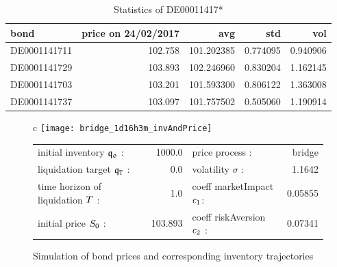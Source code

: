 \documentclass[10pt,a4paper]{article}
\begin{document}
	
	\begin{table}
		\centering
	\begin{scriptsize}
			{
	\begin{tabular}{lrrrr} 
	 \textbf{bond}  &  \textbf{price  on  24/02/2017} &         \textbf{avg} &       \textbf{std} &        \textbf{vol} \\
	 \hline
	  DE0001141711 &              102.758 &  101.202385 &  0.774095 &         0.940906 \\
	  DE0001141729 &              103.893 &  102.246960 &  0.830204 &         1.162145  \\
	  DE0001141703 &              103.201 &  101.593300 &  0.806122 &          1.363008  \\
	  DE0001141737 &              103.097 &  101.757502 &  0.505060 &         1.190914  
  	\end{tabular}} 
  \end{scriptsize}
\caption{{Statistics of DE00011417* }}
\label{tab.DE000stat}
\end{table}


	\begin{center}
		\begin{figure}
			\centering
			\begin{tabular}{c}
			\texttt{[image: bridge\_1d16h3m\_invAndPrice]} \\
				\begin{small}
					\begin{tabular}{lr | lr}
						initial inventory  $\mathfrak{q_0}   $ : & 1000.0   & price process : & bridge \\
						liquidation target $\mathfrak{q}_{\mathtt{T} }   $ : & 0.0 & volatility $\sigma   $ : & 1.1642\\
						time horizon of liquidation $T   $ : & 1.0 & coeff marketImpact $ c_{1}  $: & 0.05855\\
						initial price $S_0 $ : & 103.893 & 	coeff riskAversion $ c_{2}   $ : & 0.07341 \\
					\end{tabular}
				\end{small}
			\end{tabular}
			\caption{{Simulation of bond prices and corresponding inventory trajectories}}
			\label{fig.DE000_invAndPrice}
		\end{figure}
	\end{center}
	
	\newpage 
	
\end{document}
